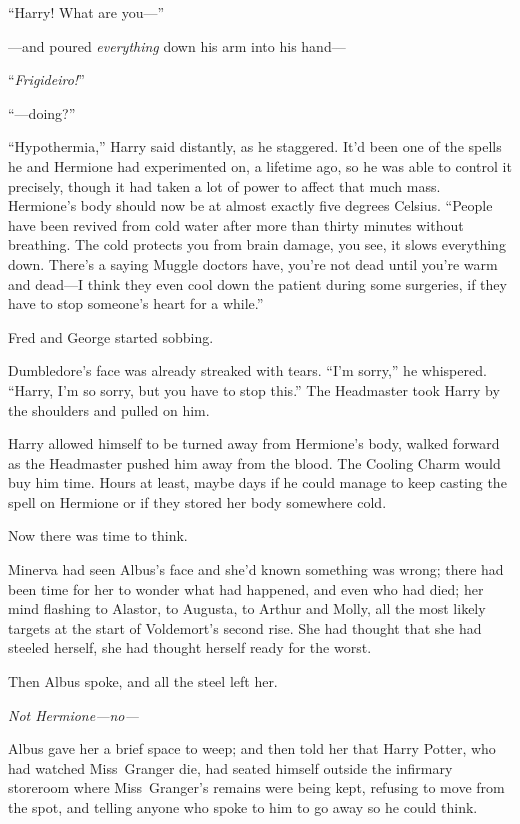 “Harry! What are you—”

—and poured \emph{everything} down his arm into his hand—

“\emph{Frigideiro!}”

“—doing?”

“Hypothermia,” Harry said distantly, as he staggered. It’d been one of the spells he and Hermione had experimented on, a lifetime ago, so he was able to control it precisely, though it had taken a lot of power to affect that much mass. Hermione’s body should now be at almost exactly five degrees Celsius. “People have been revived from cold water after more than thirty minutes without breathing. The cold protects you from brain damage, you see, it slows everything down. There’s a saying Muggle doctors have, you’re not dead until you’re warm and dead—I think they even cool down the patient during some surgeries, if they have to stop someone’s heart for a while.”

Fred and George started sobbing.

Dumbledore’s face was already streaked with tears. “I’m sorry,” he whispered. “Harry, I’m so sorry, but you have to stop this.” The Headmaster took Harry by the shoulders and pulled on him.

Harry allowed himself to be turned away from Hermione’s body, walked forward as the Headmaster pushed him away from the blood. The Cooling Charm would buy him time. Hours at least, maybe days if he could manage to keep casting the spell on Hermione or if they stored her body somewhere cold.

Now there was time to think.

\later

Minerva had seen Albus’s face and she’d known something was wrong; there had been time for her to wonder what had happened, and even who had died; her mind flashing to Alastor, to Augusta, to Arthur and Molly, all the most likely targets at the start of Voldemort’s second rise. She had thought that she had steeled herself, she had thought herself ready for the worst.

Then Albus spoke, and all the steel left her.

\emph{Not Hermione—no—}

Albus gave her a brief space to weep; and then told her that Harry Potter, who had watched Miss~Granger die, had seated himself outside the infirmary storeroom where Miss~Granger’s remains were being kept, refusing to move from the spot, and telling anyone who spoke to him to go away so he could think.

